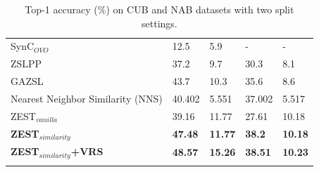 \documentclass[11pt,a4paper]{article}
\begin{document}
\begin{table}[t]
{\begin{tabular}{l|ll|ll}
SynC$_{OVO}$ \citet{changpinyo2016synthesized}      & 12.5                              & 5.9                                & -                                 & -                                  \\
ZSLPP \citet{elhoseiny2017link}                   & 37.2                              & 9.7                                & 30.3                              & 8.1                                \\
GAZSL \citet{zhu2018generative}                   & 43.7                              & 10.3                               & 35.6                              & 8.6                                \\ 
\hline
Nearest Neighbor Similarity (NNS) & 40.402                            & 5.551                              & 37.002                            & 5.517                              \\
ZEST$_{vanilla}$                                                                 & 39.16                            & 11.77                             & 27.61                            & 10.18                             \\
\hline
\textbf{ZEST$_{similarity}$}                                           & \textbf{47.48}                   & \textbf{11.77}                     & \textbf{38.2}                   & \textbf{10.18}                    \\
\hline
\textbf{ZEST$_{similarity}$+VRS}                                        & \textbf{48.57}                    & \textbf{15.26}                    & \textbf{38.51 }                   & \textbf{10.23 }                    \\ 
\Xhline{6\arrayrulewidth}
                 
\end{tabular}
}
\caption{Top-1 accuracy (\%) on CUB and NAB datasets with two split settings.}
\label{tab:results}
\end{table}
\end{document}
